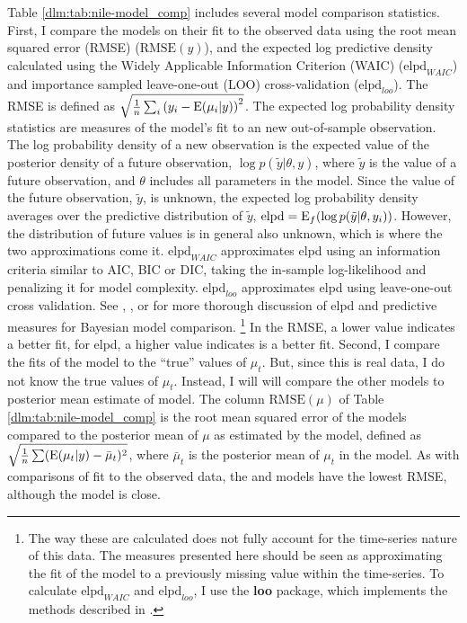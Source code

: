 Table \ref{dlm:tab:nile-model_comp} includes several model comparison statistics.
First, I compare the models on their fit to the observed data using the root mean squared error (RMSE) ($\mathrm{RMSE}(y)$), and the expected log predictive density calculated using the Widely Applicable Information Criterion (WAIC) ($\mathrm{elpd}_{WAIC}$) and importance sampled leave-one-out (LOO) cross-validation ($\mathrm{elpd}_{loo}$).
The RMSE is defined as $\sqrt{\frac{1}{n} \sum_{i} {(y_{i} - \operatorname{E}(\mu_{i} | y))}^{2}}$.
The expected log probability density statistics are measures of the model's fit to an new out-of-sample observation.
The log probability density of a new observation is the expected value of the posterior density of a future observation, $\log p(\tilde{y} | \theta, y)$, where $\tilde{y}$ is the value of a future observation, and $\theta$ includes all parameters in the model.
Since the value of the future observation, $\tilde{y}$, is unknown, the expected log probability density averages over the predictive distribution of $\tilde{y}$, $\mathrm{elpd} = \operatorname{E}_{f}(\log p(\tilde{y} | \theta, y_{i}))$. 
However, the distribution of future values is in general also unknown, which is where the two approximations come it. 
$\mathrm{elpd}_{WAIC}$ approximates elpd using an information criteria similar to AIC, BIC or DIC, taking the in-sample log-likelihood and penalizing it for model complexity.
$\mathrm{elpd}_{loo}$ approximates elpd using leave-one-out cross validation.
See \textcite{GelmanCarlinSternEtAl2013a}, \textcites{GelmanVehtari2014a}, or \textcites{GelmanHwangVehtari2014a} for more thorough discussion of elpd and predictive measures for Bayesian model comparison.%
\footnote{
  The way these are calculated does not fully account for the time-series nature of this data.
  The measures presented here should be seen as approximating the fit of the model to a previously missing value within the time-series.
  To calculate $\mathrm{elpd}_{WAIC}$ and $\mathrm{elpd}_{loo}$, I use the \textbf{loo} \RLang{} package, which implements the methods described in \textcite{GelmanVehtari2014a}.
}
In the RMSE, a lower value indicates a better fit, for elpd, a higher value indicates is a better fit.
Second, I compare the fits of the model to the ``true'' values of $\mu_{t}$. 
But, since this is real data, I do not know the true values of $\mu_{t}$.
Instead, I will will compare the other models to posterior mean estimate of  model. 
The column $\textrm{RMSE}(\mu)$ of Table \ref{dlm:tab:nile-model_comp} is the root mean squared error of the models compared to the posterior mean of $\mu$ as estimated by the  model, defined as $\sqrt{\frac{1}{n} \sum (\operatorname{E}(\mu_{t}| y) - \bar{\mu}_{t})^{2}}$, where $\bar{\mu}_{t}$ is the posterior mean of $\mu_{t}$ in the  model.
As with comparisons of fit to the observed data, the  and  models have the lowest RMSE, although the  model is close.


